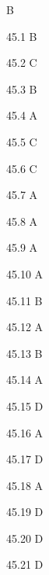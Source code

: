 \begin{Solution}{45}
B
\end{Solution}
\begin{Solution}{45.{1}}
B
\end{Solution}
\begin{Solution}{45.{2}}
C
\end{Solution}
\begin{Solution}{45.{3}}
B
\end{Solution}
\begin{Solution}{45.{4}}
A
\end{Solution}
\begin{Solution}{45.{5}}
C
\end{Solution}
\begin{Solution}{45.{6}}
C
\end{Solution}
\begin{Solution}{45.{7}}
A
\end{Solution}
\begin{Solution}{45.{8}}
A
\end{Solution}
\begin{Solution}{45.{9}}
A
\end{Solution}
\begin{Solution}{45.{10}}
A
\end{Solution}
\begin{Solution}{45.{11}}
B
\end{Solution}
\begin{Solution}{45.{12}}
A
\end{Solution}
\begin{Solution}{45.{13}}
B
\end{Solution}
\begin{Solution}{45.{14}}
A
\end{Solution}
\begin{Solution}{45.{15}}
D
\end{Solution}
\begin{Solution}{45.{16}}
A
\end{Solution}
\begin{Solution}{45.{17}}
D
\end{Solution}
\begin{Solution}{45.{18}}
A
\end{Solution}
\begin{Solution}{45.{19}}
D
\end{Solution}
\begin{Solution}{45.{20}}
D
\end{Solution}
\begin{Solution}{45.{21}}
D
\end{Solution}

